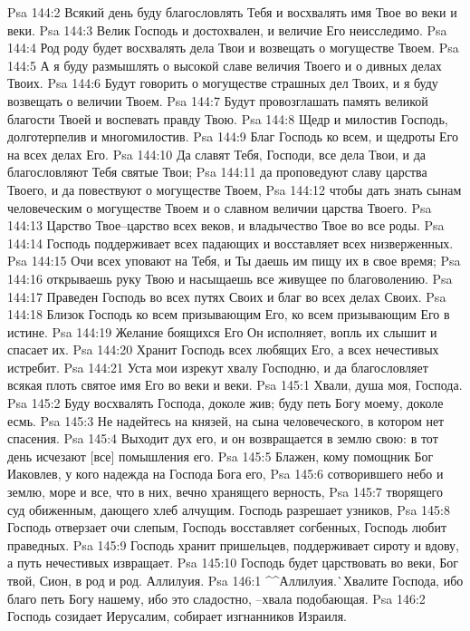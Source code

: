 Psa 144:2  Всякий день буду благословлять Тебя и восхвалять имя Твое во веки и веки.
Psa 144:3  Велик Господь и достохвален, и величие Его неисследимо.
Psa 144:4  Род роду будет восхвалять дела Твои и возвещать о могуществе Твоем.
Psa 144:5  А я буду размышлять о высокой славе величия Твоего и о дивных делах Твоих.
Psa 144:6  Будут говорить о могуществе страшных дел Твоих, и я буду возвещать о величии Твоем.
Psa 144:7  Будут провозглашать память великой благости Твоей и воспевать правду Твою.
Psa 144:8  Щедр и милостив Господь, долготерпелив и многомилостив.
Psa 144:9  Благ Господь ко всем, и щедроты Его на всех делах Его.
Psa 144:10  Да славят Тебя, Господи, все дела Твои, и да благословляют Тебя святые Твои;
Psa 144:11  да проповедуют славу царства Твоего, и да повествуют о могуществе Твоем,
Psa 144:12  чтобы дать знать сынам человеческим о могуществе Твоем и о славном величии царства Твоего.
Psa 144:13  Царство Твое--царство всех веков, и владычество Твое во все роды.
Psa 144:14  Господь поддерживает всех падающих и восставляет всех низверженных.
Psa 144:15  Очи всех уповают на Тебя, и Ты даешь им пищу их в свое время;
Psa 144:16  открываешь руку Твою и насыщаешь все живущее по благоволению.
Psa 144:17  Праведен Господь во всех путях Своих и благ во всех делах Своих.
Psa 144:18  Близок Господь ко всем призывающим Его, ко всем призывающим Его в истине.
Psa 144:19  Желание боящихся Его Он исполняет, вопль их слышит и спасает их.
Psa 144:20  Хранит Господь всех любящих Его, а всех нечестивых истребит.
Psa 144:21  Уста мои изрекут хвалу Господню, и да благословляет всякая плоть святое имя Его во веки и веки.
Psa 145:1  Хвали, душа моя, Господа.
Psa 145:2  Буду восхвалять Господа, доколе жив; буду петь Богу моему, доколе есмь.
Psa 145:3  Не надейтесь на князей, на сына человеческого, в котором нет спасения.
Psa 145:4  Выходит дух его, и он возвращается в землю свою: в тот день исчезают [все] помышления его.
Psa 145:5  Блажен, кому помощник Бог Иаковлев, у кого надежда на Господа Бога его,
Psa 145:6  сотворившего небо и землю, море и все, что в них, вечно хранящего верность,
Psa 145:7  творящего суд обиженным, дающего хлеб алчущим. Господь разрешает узников,
Psa 145:8  Господь отверзает очи слепым, Господь восставляет согбенных, Господь любит праведных.
Psa 145:9  Господь хранит пришельцев, поддерживает сироту и вдову, а путь нечестивых извращает.
Psa 145:10  Господь будет царствовать во веки, Бог твой, Сион, в род и род. Аллилуия.
Psa 146:1  ^^Аллилуия.^^ Хвалите Господа, ибо благо петь Богу нашему, ибо это сладостно, --хвала подобающая.
Psa 146:2  Господь созидает Иерусалим, собирает изгнанников Израиля.
